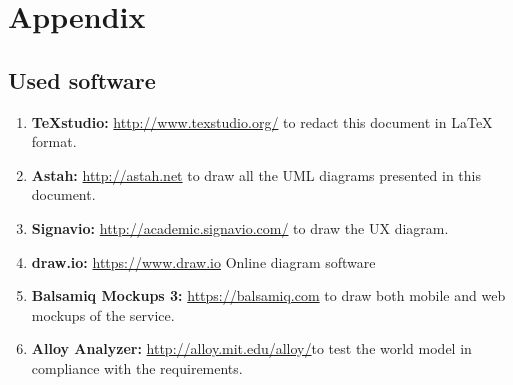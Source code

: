 \documentclass[english]{article}
\newcounter{requirement}
\begin{document}
	
	\pagebreak
	
	\pagebreak
	
	\pagebreak
	
	\pagebreak
	
	\pagebreak
	\section{Appendix}
	
	\subsection{Used software}
	\begin{enumerate}
		\item \textbf{TeXstudio:} \url{http://www.texstudio.org/} to redact this document in {\LaTeX} format.
		\item \textbf{Astah:} \url{http://astah.net} to draw all the UML diagrams presented in this document.
		\item \textbf{Signavio:} \url{http://academic.signavio.com/} to draw the UX diagram.
		\item \textbf{draw.io:} \url{https://www.draw.io} Online diagram software
		\item \textbf{Balsamiq Mockups 3:} \url{https://balsamiq.com} to draw both mobile and web mockups of the service.
		\item \textbf{Alloy Analyzer:}  \url{http://alloy.mit.edu/alloy/}to test the world model in compliance with the requirements.
	\end{enumerate}
	
\end{document}

